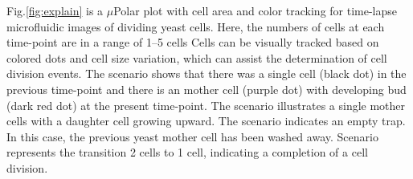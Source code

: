 \documentclass[conference]{IEEEtran}
\begin{document}
Fig.\ref{fig:explain} is a $\mu$Polar plot with cell area and color tracking for time-lapse microfluidic images of dividing yeast cells. Here, the numbers of cells at each time-point are in a range of 1--5 cells Cells can be visually tracked based on colored dots  and cell size variation, which can assist the determination of cell division events.
The  scenario shows that there was a single cell (black dot) in the previous time-point and there is an mother cell (purple dot) with developing bud (dark red dot) at the present time-point. 
The  scenario illustrates a single mother cells with a daughter cell growing upward. 
The  scenario indicates an empty trap. In this case, the previous yeast mother cell has been washed away. 
Scenario  represents the transition 2 cells to 1 cell, indicating a completion of a cell division. 
\end{document}

